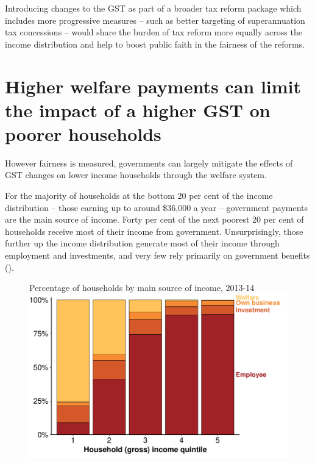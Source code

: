 Introducing changes to the GST as part of a broader tax reform package which includes more progressive measures – such as better targeting of superannuation tax concessions – would share the burden of tax reform more equally across the income distribution and help to boost public faith in the fairness of the reforms. 

\section{Higher welfare payments can limit the impact of a higher GST on poorer households}\label{sec:GST-3-2}
However fairness is measured, governments can largely mitigate the effects of GST changes on lower income households through the welfare system.

For the majority of households at the bottom 20 per cent of the income distribution – those earning up to around \$36,000 a year  – government payments are the main source of income. Forty per cent of the next poorest 20 per cent of households receive most of their income from government. Unsurprisingly, those further up the income distribution generate most of their income through employment and investments, and very few rely primarily on government benefits (). 

\begin{figure}
%
{Percentage of households by main source of income, 2013-14}
\includegraphics[width=\columnwidth]{atlas/figure/GST-Figure-5-1.pdf}

\end{figure}

